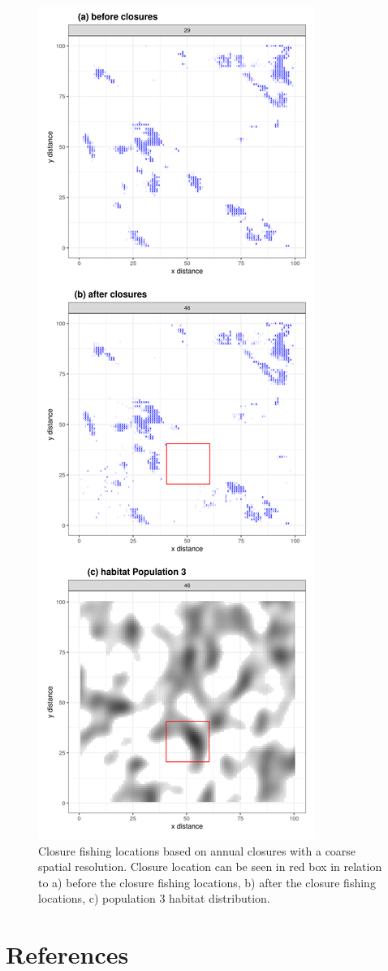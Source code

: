 \documentclass[review]{elsarticle}
\begin{document}
\begin{figure}[!ht]
	\centering
	\includegraphics[width =0.5\linewidth]{./Plots/Closure_fishing_locations_yearly}
	\caption{Closure fishing locations based on annual closures with a
		coarse spatial resolution. Closure location can be seen in red
		box in relation to a) before the closure fishing locations, b)
		after the closure fishing locations, c) population 3 habitat
		distribution.}
	\label{fig:17}
\end{figure}	

\clearpage

\section*{References}


\end{document}
